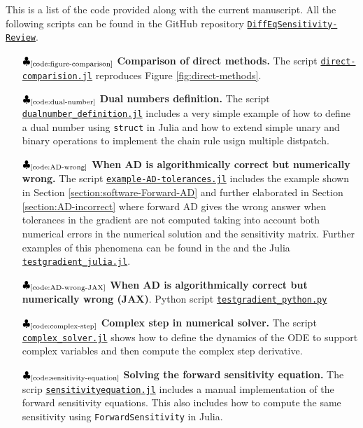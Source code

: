 This is a list of the code provided along with the current manuscript.
All the following scripts can be found in the GitHub repository \href{https://github.com/ODINN-SciML/DiffEqSensitivity-Review}{\texttt{DiffEqSensitivity-Review}}. 
 
\begin{itemize}
    \item[$\clubsuit_\text{\ref{code:figure-comparison}}$] \textbf{Comparison of direct methods.} The script \href{https://github.com/ODINN-SciML/DiffEqSensitivity-Review/blob/main/code/DirectMethods/Comparison/direct-comparision.jl}{\texttt{direct-comparision.jl}} reproduces Figure \ref{fig:direct-methods}.
    \item[$\clubsuit_\text{\ref{code:dual-number}}$] \textbf{Dual numbers definition.} The script \href{https://github.com/ODINN-SciML/DiffEqSensitivity-Review/blob/main/code/DirectMethods/DualNumbers/dualnumber_definition.jl}{\texttt{dualnumber\_definition.jl}} includes a very simple example of how to define a dual number using \texttt{struct} in Julia and how to extend simple unary and binary operations to implement the chain rule usign multiple distpatch. 
    \item[$\clubsuit_\text{\ref{code:AD-wrong}}$] \textbf{When AD is algorithmically correct but numerically wrong.} The script \href{https://github.com/ODINN-SciML/DiffEqSensitivity-Review/blob/main/code/SensitivityForwardAD/example-AD-tolerances.jl}{\texttt{example-AD-tolerances.jl}} includes the example shown in Section \ref{section:software-Forward-AD} and further elaborated in Section \ref{section:AD-incorrect} where forward AD gives the wrong answer when tolerances in the gradient are not computed taking into account both numerical errors in the numerical solution and the sensitivity matrix. Further examples of this phenomena can be found in the  and the Julia \href{https://github.com/ODINN-SciML/DiffEqSensitivity-Review/blob/main/code/SensitivityForwardAD/testgradient_julia.jl}{\texttt{testgradient\_julia.jl}}.
    \item[$\clubsuit_\text{\ref{code:AD-wrong-JAX}}$] \textbf{When AD is algorithmically correct but numerically wrong (JAX)}. Python script \href{https://github.com/ODINN-SciML/DiffEqSensitivity-Review/blob/main/code/SensitivityForwardAD/testgradient_python.py}{\texttt{testgradient\_python.py}}
    \item[$\clubsuit_\text{\ref{code:complex-step}}$] \textbf{Complex step in numerical solver.} The script \href{https://github.com/ODINN-SciML/DiffEqSensitivity-Review/blob/main/code/DirectMethods/ComplexStep/complex_solver.jl}{\texttt{complex\_solver.jl}} shows how to define the dynamics of the ODE to support complex variables and then compute the complex step derivative. 
    \item[$\clubsuit_\text{\ref{code:sensitivity-equation}}$] \textbf{Solving the forward sensitivity equation. } The scrip \href{https://github.com/ODINN-SciML/DiffEqSensitivity-Review/blob/main/code/SolverMethods/sensitivityequation.jl}{\texttt{sensitivityequation.jl}} includes a manual implementation of the  forward sensitivity equations. This also includes how to compute the same sensitivity using \texttt{ForwardSensitivity} in Julia.  
\end{itemize}